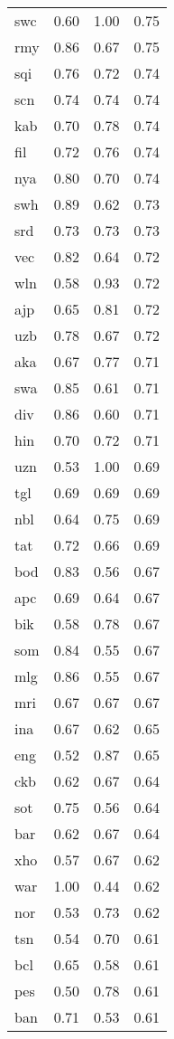 \begin{table}
\begin{tabular}{lrrr}
swc & 0.60 & 1.00 & 0.75 \\
rmy & 0.86 & 0.67 & 0.75 \\
sqi & 0.76 & 0.72 & 0.74 \\
scn & 0.74 & 0.74 & 0.74 \\
kab & 0.70 & 0.78 & 0.74 \\
fil & 0.72 & 0.76 & 0.74 \\
nya & 0.80 & 0.70 & 0.74 \\
swh & 0.89 & 0.62 & 0.73 \\
srd & 0.73 & 0.73 & 0.73 \\
vec & 0.82 & 0.64 & 0.72 \\
wln & 0.58 & 0.93 & 0.72 \\
ajp & 0.65 & 0.81 & 0.72 \\
uzb & 0.78 & 0.67 & 0.72 \\
aka & 0.67 & 0.77 & 0.71 \\
swa & 0.85 & 0.61 & 0.71 \\
div & 0.86 & 0.60 & 0.71 \\
hin & 0.70 & 0.72 & 0.71 \\
uzn & 0.53 & 1.00 & 0.69 \\
tgl & 0.69 & 0.69 & 0.69 \\
nbl & 0.64 & 0.75 & 0.69 \\
tat & 0.72 & 0.66 & 0.69 \\
bod & 0.83 & 0.56 & 0.67 \\
apc & 0.69 & 0.64 & 0.67 \\
bik & 0.58 & 0.78 & 0.67 \\
som & 0.84 & 0.55 & 0.67 \\
mlg & 0.86 & 0.55 & 0.67 \\
mri & 0.67 & 0.67 & 0.67 \\
ina & 0.67 & 0.62 & 0.65 \\
eng & 0.52 & 0.87 & 0.65 \\
ckb & 0.62 & 0.67 & 0.64 \\
sot & 0.75 & 0.56 & 0.64 \\
bar & 0.62 & 0.67 & 0.64 \\
xho & 0.57 & 0.67 & 0.62 \\
war & 1.00 & 0.44 & 0.62 \\
nor & 0.53 & 0.73 & 0.62 \\
tsn & 0.54 & 0.70 & 0.61 \\
bcl & 0.65 & 0.58 & 0.61 \\
pes & 0.50 & 0.78 & 0.61 \\
ban & 0.71 & 0.53 & 0.61 \\

\end{tabular}
\end{table}
